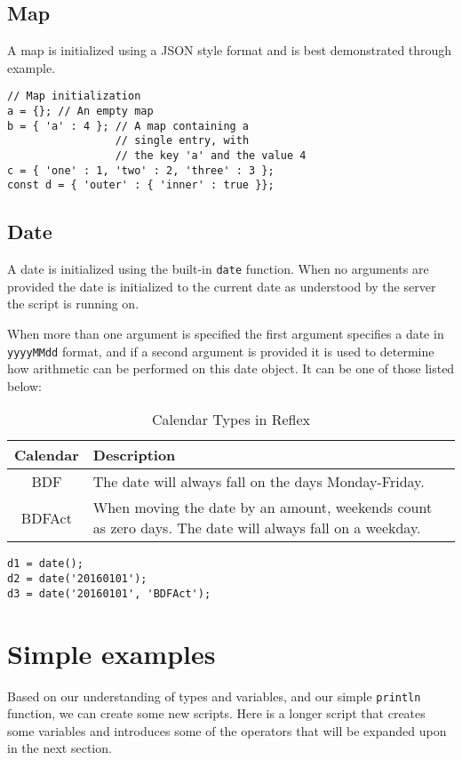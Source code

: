 \subsection{Map}
A map  is initialized using a JSON style format and is best demonstrated through example.
\begin{lstlisting}[caption={Map initialization}]
// Map initialization
a = {}; // An empty map
b = { 'a' : 4 }; // A map containing a
                 // single entry, with
                 // the key 'a' and the value 4
c = { 'one' : 1, 'two' : 2, 'three' : 3 };
const d = { 'outer' : { 'inner' : true }};
\end{lstlisting}
\subsection{Date}
A date  is initialized using the built-in \Verb+date+ function. When no arguments are provided the date is
initialized to the current date as understood by the server the script is running on.

When more than one argument is specified the first argument specifies a date in \Verb+yyyyMMdd+ format, and if a second
argument is provided it is used to determine how arithmetic can be performed on this date object. It can be one of those listed below:

\begin{table}[h!]
\small
\centering
\begin{tabular} { | c | p{7cm} | }
\hline
Calendar & Description \\
\hline
BDF & The date will always fall on the days Monday-Friday. \\
BDFAct & When moving the date by an amount, weekends count as zero days. The date will always fall on a weekday. \\
\hline
\end{tabular}
\label{tab:DateCalendarTypes}
\caption{Calendar Types in Reflex}
\end{table}

\begin{lstlisting}[caption={Date examples}]
d1 = date();
d2 = date('20160101');
d3 = date('20160101', 'BDFAct');
\end{lstlisting}


\section{Simple examples}
Based on our understanding of types and variables, and our simple \Verb+println+ function, we can create some new \Reflex scripts. Here is a longer script that creates some variables and introduces some of the operators that will be expanded upon in the next section.

